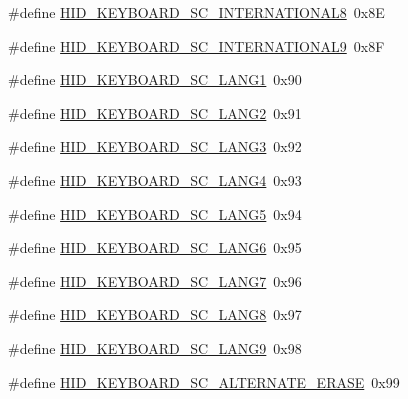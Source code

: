\begin{DoxyCompactItemize}
\item 
\#define \hyperlink{group__Group__USBClassHIDCommon_ga1b0a5a4367d242717aa77c4988540aca}{H\+I\+D\+\_\+\+K\+E\+Y\+B\+O\+A\+R\+D\+\_\+\+S\+C\+\_\+\+I\+N\+T\+E\+R\+N\+A\+T\+I\+O\+N\+A\+L8}~0x8E
\item 
\#define \hyperlink{group__Group__USBClassHIDCommon_ga3d043c1ffb9e838e48e1f104661ee7bd}{H\+I\+D\+\_\+\+K\+E\+Y\+B\+O\+A\+R\+D\+\_\+\+S\+C\+\_\+\+I\+N\+T\+E\+R\+N\+A\+T\+I\+O\+N\+A\+L9}~0x8F
\item 
\#define \hyperlink{group__Group__USBClassHIDCommon_gad3972cc2fe4fdc6fb09e3b1d5e98467d}{H\+I\+D\+\_\+\+K\+E\+Y\+B\+O\+A\+R\+D\+\_\+\+S\+C\+\_\+\+L\+A\+N\+G1}~0x90
\item 
\#define \hyperlink{group__Group__USBClassHIDCommon_gaec2f4f5a05226109ed7875b05eaf9386}{H\+I\+D\+\_\+\+K\+E\+Y\+B\+O\+A\+R\+D\+\_\+\+S\+C\+\_\+\+L\+A\+N\+G2}~0x91
\item 
\#define \hyperlink{group__Group__USBClassHIDCommon_gaee057e6396027f3d4a910f3c9c5b017b}{H\+I\+D\+\_\+\+K\+E\+Y\+B\+O\+A\+R\+D\+\_\+\+S\+C\+\_\+\+L\+A\+N\+G3}~0x92
\item 
\#define \hyperlink{group__Group__USBClassHIDCommon_gaaed05e186bed2d0e7e56dbf03eeb5dc0}{H\+I\+D\+\_\+\+K\+E\+Y\+B\+O\+A\+R\+D\+\_\+\+S\+C\+\_\+\+L\+A\+N\+G4}~0x93
\item 
\#define \hyperlink{group__Group__USBClassHIDCommon_ga9e0338511312bec312a828a84be00592}{H\+I\+D\+\_\+\+K\+E\+Y\+B\+O\+A\+R\+D\+\_\+\+S\+C\+\_\+\+L\+A\+N\+G5}~0x94
\item 
\#define \hyperlink{group__Group__USBClassHIDCommon_gacf11f903f3c4f1c3147ca478090679c3}{H\+I\+D\+\_\+\+K\+E\+Y\+B\+O\+A\+R\+D\+\_\+\+S\+C\+\_\+\+L\+A\+N\+G6}~0x95
\item 
\#define \hyperlink{group__Group__USBClassHIDCommon_ga6b9dc7663b6cfd9324986aa15f2a5f4a}{H\+I\+D\+\_\+\+K\+E\+Y\+B\+O\+A\+R\+D\+\_\+\+S\+C\+\_\+\+L\+A\+N\+G7}~0x96
\item 
\#define \hyperlink{group__Group__USBClassHIDCommon_gaf670faac83af80ea998cb2848fbb91aa}{H\+I\+D\+\_\+\+K\+E\+Y\+B\+O\+A\+R\+D\+\_\+\+S\+C\+\_\+\+L\+A\+N\+G8}~0x97
\item 
\#define \hyperlink{group__Group__USBClassHIDCommon_ga90b4f67aa31cad1abe46cd9e17c04379}{H\+I\+D\+\_\+\+K\+E\+Y\+B\+O\+A\+R\+D\+\_\+\+S\+C\+\_\+\+L\+A\+N\+G9}~0x98
\item 
\#define \hyperlink{group__Group__USBClassHIDCommon_ga6a1a2b43bab269733b296e794ccfdb43}{H\+I\+D\+\_\+\+K\+E\+Y\+B\+O\+A\+R\+D\+\_\+\+S\+C\+\_\+\+A\+L\+T\+E\+R\+N\+A\+T\+E\+\_\+\+E\+R\+A\+SE}~0x99

\end{DoxyCompactItemize}
